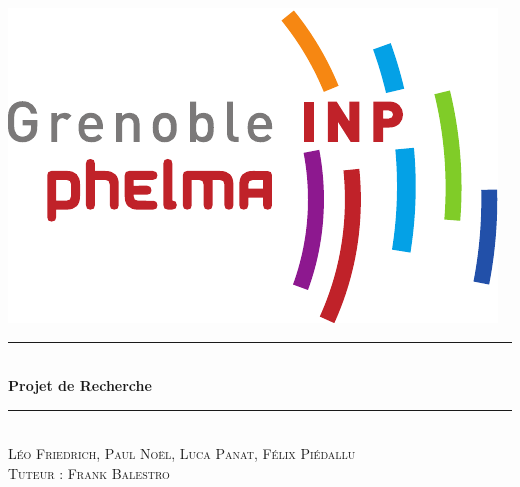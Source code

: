 \begin{titlepage}
        \vspace*{1cm}
\includegraphics[scale=0.45]{Images/logo_phelma.pdf}
    \begin{flushright}
    \end{flushright}
\begin{center}
    \vspace*{2cm}
    \rule{\linewidth}{0.5mm}\\[0.4cm]
    {\huge\bfseries Projet de Recherche\\
    [0.4cm]}\rule{\linewidth}{0.5mm}\\[0.5cm]
    \large{\textsc{Léo Friedrich, Paul Noël, Luca Panat, Félix Piédallu}}\\[2cm]
    \large{\textsc{Tuteur : Frank Balestro}}\\[2cm]


\end{center}
\end{titlepage}

\tableofcontents        %
\newpage
{}  %
